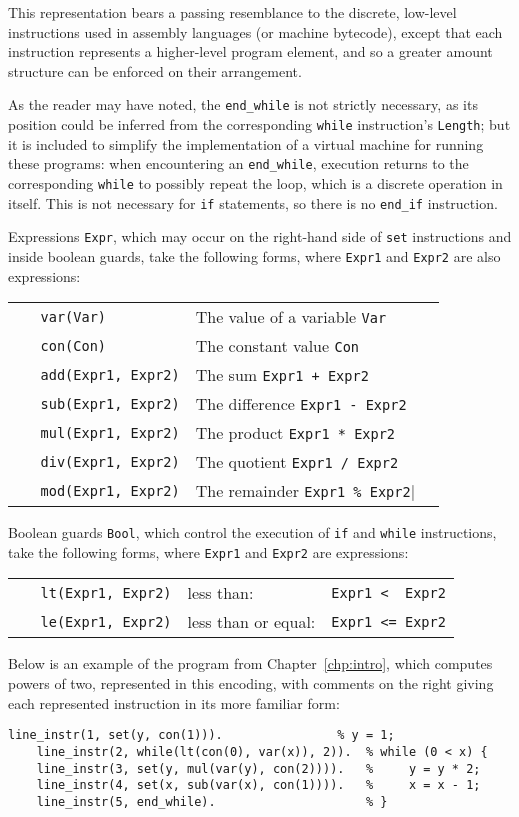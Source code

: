 \documentclass[a4paper,twoside,notitlepage]{report}
\begin{document}
This representation bears a passing resemblance to the discrete, low-level 
instructions used in assembly languages (or machine bytecode), except that 
each instruction represents a higher-level program element, and so a greater 
amount structure can be enforced on their arrangement.

As the reader may have noted, the \verb|end_while| is not strictly necessary, 
as its position could be inferred from the corresponding \verb|while| 
instruction's \verb|Length|; but it is included to simplify the implementation 
of a virtual machine for running these programs: when encountering an 
\verb|end_while|, execution returns to the corresponding \verb|while| to 
possibly repeat the loop, which is a discrete operation in itself. This is not 
necessary for \verb|if| statements, so there is no \verb|end_if| instruction.

Expressions \verb|Expr|, which may occur on the right-hand side of 
\verb|set| instructions and inside boolean guards, take the following 
forms, where \verb|Expr1| and \verb|Expr2| are also expressions:

\begin{tabular}{lll}
    \verb|   var(Var)|          & The value of a variable \verb|Var|
\\  \verb|   con(Con)|          & The constant value \verb|Con|
\\  \verb|   add(Expr1, Expr2)| & The sum \verb|Expr1 + Expr2|
\\  \verb|   sub(Expr1, Expr2)| & The difference \verb|Expr1 - Expr2|
\\  \verb|   mul(Expr1, Expr2)| & The product \verb|Expr1 * Expr2|
\\  \verb|   div(Expr1, Expr2)| & The quotient \verb|Expr1 / Expr2|
\\  \verb|   mod(Expr1, Expr2)| & The remainder \verb|Expr1 % Expr2|
\end{tabular}

Boolean guards \verb|Bool|, which control the execution of \verb|if| and 
\verb|while| instructions, take the following forms, where \verb|Expr1| 
and \verb|Expr2| are expressions:

\begin{tabular}{lll}
    \verb|   lt(Expr1, Expr2)| & less than:          & \verb|Expr1 <  Expr2|
\\  \verb|   le(Expr1, Expr2)| & less than or equal: & \verb|Expr1 <= Expr2|
\end{tabular}

Below is an example of the program from Chapter~\ref{chp:intro}, which 
computes powers of two, represented in this encoding, with comments on 
the right giving each represented instruction in its more familiar form:
\begin{Verbatim}[samepage=true]
    line_instr(1, set(y, con(1))).                % y = 1;
    line_instr(2, while(lt(con(0), var(x)), 2)).  % while (0 < x) {
    line_instr(3, set(y, mul(var(y), con(2)))).   %     y = y * 2;
    line_instr(4, set(x, sub(var(x), con(1)))).   %     x = x - 1;
    line_instr(5, end_while).                     % }
\end{Verbatim}
\end{document}
